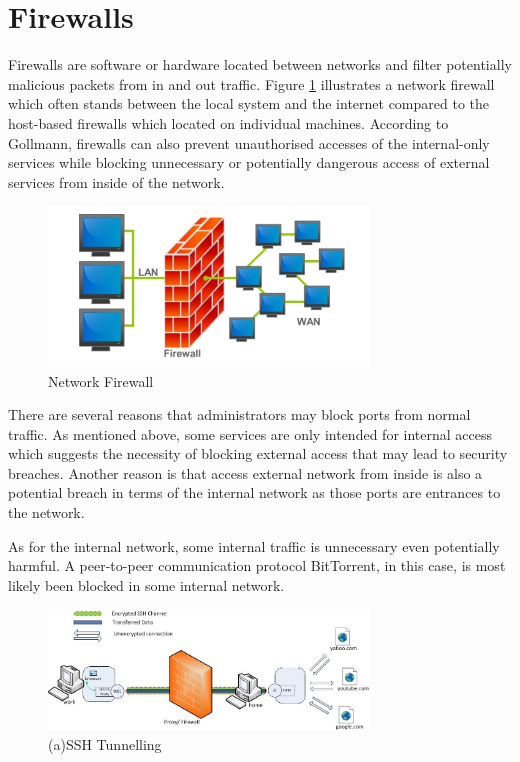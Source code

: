 \documentclass{article}
\begin{document}
\section{Firewalls}
\label{sec:firewalls}

Firewalls are software or hardware located between networks and filter potentially malicious 
packets from in and out traffic\cite{AndersonRoss1956-2008Se:a}.
Figure \ref{firewall} illustrates a network firewall which often stands between the local system and 
the internet compared to the host-based firewalls which located on individual machines. 
According to Gollmann, firewalls can also prevent unauthorised accesses of the internal-only services while 
blocking unnecessary or potentially dangerous access of external services from inside of the network\cite{GollmannDieter2011Cs/D}.

\begin{figure}[H]
  \includegraphics[width=8.5cm]{firewall}
  \caption{Network Firewall}
  \label{firewall}
\end{figure}

There are several reasons that administrators may block ports from normal traffic. As mentioned above, some services 
are only intended for internal access which suggests the necessity of blocking external access that 
may lead to security breaches. Another reason is that access external network from inside is also a potential 
breach in terms of the internal network as those ports are entrances to the network. 

As for the internal network, some internal traffic is unnecessary even potentially harmful. A peer-to-peer 
communication protocol BitTorrent, in this case, is most likely been blocked in some internal network.

\begin{figure}[H]
  \includegraphics[width=8.5cm]{ssh}
  \caption{(a)SSH Tunnelling\cite{chamith_2012}}
  \label{ssh}
\end{figure}
\end{document}
